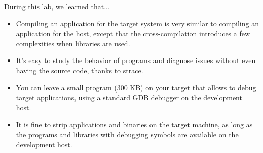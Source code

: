 During this lab, we learned that...
\begin{itemize}
\item Compiling an application for the target system is very similar
  to compiling an application for the host, except that the
  cross-compilation introduces a few complexities when libraries are
  used.

\item It's easy to study the behavior of programs and diagnose issues
  without even having the source code, thanks to strace.

\item You can leave a small  program (300 KB) on your target
  that allows to debug target applications, using a standard GDB
  debugger on the development host.

\item It is fine to strip applications and binaries on the target
  machine, as long as the programs and libraries with debugging
  symbols are available on the development host.

\end{itemize}

